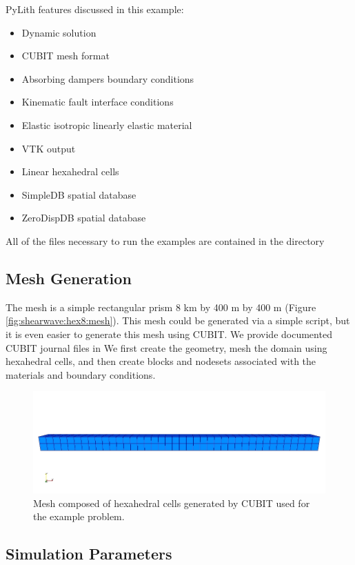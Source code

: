 PyLith features discussed in this example:
\begin{itemize}
\item Dynamic solution
\item CUBIT mesh format
\item Absorbing dampers boundary conditions
\item Kinematic fault interface conditions
\item Elastic isotropic linearly elastic material
\item VTK output
\item Linear hexahedral cells
\item SimpleDB spatial database
\item ZeroDispDB spatial database
\end{itemize}
All of the files necessary to run the examples are contained in the
directory 


\subsection{Mesh Generation}

The mesh is a simple rectangular prism 8 km by 400 m by 400 m (Figure
\vref{fig:shearwave:hex8:mesh}). This mesh could be generated via
a simple script, but it is even easier to generate this mesh using
CUBIT. We provide documented CUBIT journal files in 
We first create the geometry, mesh the domain using hexahedral cells,
and then create blocks and nodesets associated with the materials
and boundary conditions.

\begin{figure}
  \includegraphics[scale=0.5]{examples/figs/shearwave_hex8mesh}
  \caption{Mesh composed of hexahedral cells generated by CUBIT used for the
    example problem.}
  \label{fig:shearwave:hex8:mesh}
\end{figure}


\subsection{Simulation Parameters}

